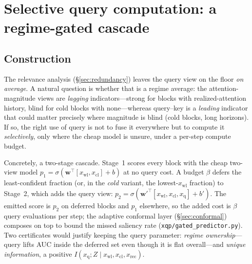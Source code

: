 \section{Selective query computation: a regime-gated cascade}
\label{sec:gated}

\subsection{Construction}
The relevance analysis (\S\ref{sec:redundancy}) leaves the query view on the
floor \emph{on average}. A natural question is whether that is a regime average:
the attention-magnitude views are \emph{lagging} indicators---strong for blocks
with realized-attention history, blind for cold blocks with none---whereas
query--key is a \emph{leading} indicator that could matter precisely where
magnitude is blind (cold blocks, long horizons). If so, the right use of query is
not to fuse it everywhere but to compute it \emph{selectively}, only where the
cheap model is unsure, under a per-step compute budget.

Concretely, a two-stage cascade. Stage~1 scores every block with the cheap
two-view model $p_1=\sigma(\mathbf{w}^\top[x_{\text{wl}},x_{\text{cl}}]+b)$ at no
query cost. A budget $\beta$ defers the least-confident fraction (or, in the
\emph{cold} variant, the lowest-$x_{\text{wl}}$ fraction) to Stage~2, which adds
the query view: $p_2=\sigma(\mathbf{w}'^\top[x_{\text{wl}},x_{\text{cl}},
x_{\text{q}}]+b')$. The emitted score is $p_2$ on deferred blocks and $p_1$
elsewhere, so the added cost is $\beta$ query evaluations per step; the adaptive
conformal layer (\S\ref{sec:conformal}) composes on top to bound the missed
saliency rate (\texttt{xqp/gated\_predictor.py}). Two certificates would justify
keeping the query parameter: \emph{regime ownership}---query lifts AUC inside the
deferred set even though it is flat overall---and \emph{unique information}, a
positive $I(x_{\text{q}};Z\mid x_{\text{wl}},x_{\text{cl}},x_{\text{rec}})$.

